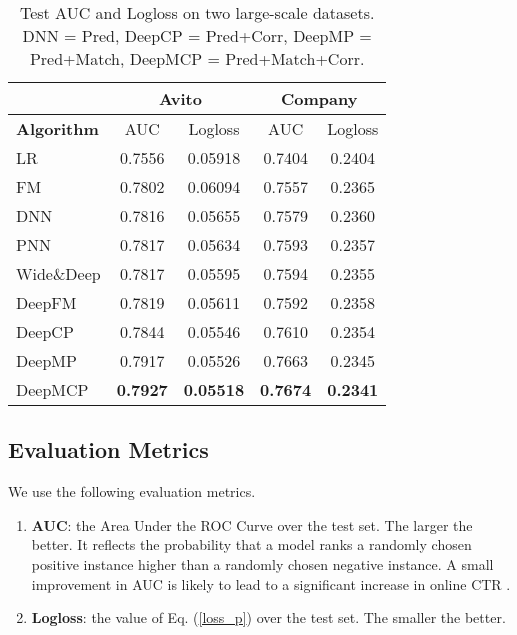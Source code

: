 \documentclass{article}
\begin{document}
\begin{table}[!t]
\setlength{\tabcolsep}{4pt}
\renewcommand{\arraystretch}{1.3}
\centering
\begin{tabular}{|l|c|c||c|c|}
\hline
 & \multicolumn{2}{|c||}{\textbf{Avito}} & \multicolumn{2}{|c|}{\textbf{Company}} \\
\hline
\textbf{Algorithm} & AUC & Logloss & AUC & Logloss\\
\hline
LR & 0.7556 & 0.05918 & 0.7404 & 0.2404 \\
FM & 0.7802 & 0.06094 & 0.7557 & 0.2365 \\
DNN & 0.7816 & 0.05655 & 0.7579 & 0.2360 \\
PNN & 0.7817 & 0.05634 & 0.7593 & 0.2357 \\
Wide\&Deep & 0.7817 & 0.05595 & 0.7594 & 0.2355 \\
DeepFM & 0.7819 & 0.05611 & 0.7592 & 0.2358 \\
\hline
DeepCP & 0.7844 & 0.05546 & 0.7610 & 0.2354 \\
DeepMP & 0.7917 & 0.05526 & 0.7663 & 0.2345 \\
DeepMCP & \textbf{0.7927} & \textbf{0.05518} & \textbf{0.7674} & \textbf{0.2341} \\
\hline
\end{tabular}
\vskip -4pt
\caption{Test AUC and Logloss on two large-scale datasets. DNN = Pred, DeepCP = Pred+Corr, DeepMP = Pred+Match, DeepMCP = Pred+Match+Corr.}
\label{tab_auc}
\end{table}

\subsection{Evaluation Metrics} \label{sec_metric}
We use the following evaluation metrics.
\begin{enumerate}
\item \textbf{AUC}: the Area Under the ROC Curve over the test set. The larger the better. It reflects the probability that a model ranks a randomly chosen positive instance higher than a randomly chosen negative instance. A small improvement in AUC is likely to lead to a significant increase in online CTR \cite{cheng2016wide}.
\item \textbf{Logloss}: the value of Eq. (\ref{loss_p}) over the test set. The smaller the better.
\end{enumerate}
\end{document}
